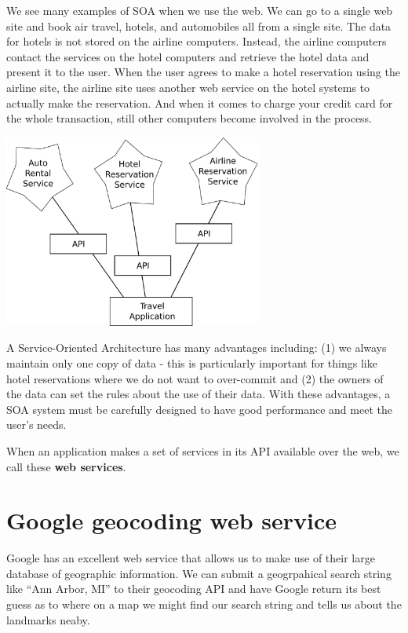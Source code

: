 \documentclass[11pt]{book}
\begin{document}
We see many examples of SOA when we use the web.  We can go to a single 
web site and book air travel, hotels, and automobiles all from a 
single site.  The data for hotels is not stored on the airline computers. 
Instead, the airline computers contact the services on the hotel computers
and retrieve the hotel data and present it to the user.  When the user
agrees to make a hotel reservation using the airline site, the airline site uses
another web service on the hotel systems to actually make the reservation.
And when it comes to charge your credit card for the whole transaction, 
still other computers become involved in the process.

\beforefig
\centerline{\includegraphics[height=2.50in]{figs2/soa.eps}}
\afterfig

A Service-Oriented Architecture has many advantages including: (1) we 
always maintain only one copy of data - this is particularly important
for things like hotel reservations where we do not want to over-commit
and (2) the owners of the data can set the rules about the use of their 
data.   With these advantages, a SOA system must be carefully designed
to have good performance and meet the user's needs.

When an application makes a set of services in its API available over the web, 
we call these {\bf web services}. 

\section{Google geocoding web service}

Google has an excellent web service that allows us to make use of their 
large database of geographic information.   We can submit a geogrpahical
search string like ``Ann Arbor, MI'' to their geocoding API and have Google 
return its best guess as to where on a map we might find our search string and
tells us about the landmarks neaby.
\end{document}
